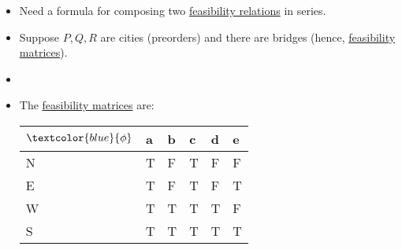 \begin{itemize}
    \item Need a formula for composing two \href{doc/1 math/Seven Sketches in Compositionality/Chapter 4: Co-design/2 Enriched profunctors/1 Feasibility relationships as Bool-profunctors/1 Feasilibiliy relation}{feasibility relations} in series.
    \item Suppose $P,Q,R$ are cities (preorders) and there are bridges (hence, \href{doc/1 math/Seven Sketches in Compositionality/Chapter 4: Co-design/2 Enriched profunctors/2 V-profunctors/4 Exercise 4-12}{feasibility matrices}).
    \item


    \item The \href{doc/1 math/Seven Sketches in Compositionality/Chapter 4: Co-design/2 Enriched profunctors/2 V-profunctors/4 Exercise 4-12}{feasibility matrices} are:

          \begin{minipage}{0.48\textwidth}

            \begin{tabular}{|l|l|l|l|l|l|}
              \hline
              $\textcolor{blue}{\phi}$ & a & b & c & d & e \\ \hline
              N                        & T & F & T & F & F \\ \hline
              E                        & T & F & T & F & T \\ \hline
              W                        & T & T & T & T & F \\ \hline
              S                        & T & T & T & T & T \\ \hline
            \end{tabular}
          \end{minipage}


\end{itemize}
